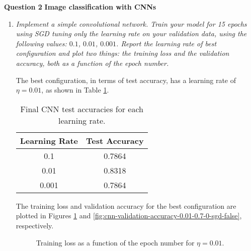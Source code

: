 \documentclass[12pt]{article}
\begin{document}
\center\large{\textbf{Question 2}}
\center\textbf{Image classification with CNNs}

\begin{enumerate}[leftmargin=\labelsep]

    \item \textit{Implement a simple convolutional network. Train your model for 15 epochs using SGD tuning only the learning rate on your validation data, using the following values: $0.1$, $0.01$, $0.001$. Report the learning rate of best configuration and plot two things: the training loss and the validation accuracy, both as a function of the epoch number.}

          \vspace{12pt}

          The best configuration, in terms of test accuracy, has a learning rate of $\eta = 0.01$, as shown in Table \ref{tab:cnn-pool-test-acc}.

          \begin{table}[H]
              \centering
              \begin{tabular}{|c|c|}
                  \hline
                  \textbf{Learning Rate} & \textbf{Test Accuracy} \\ \hline
                  0.1                    & 0.7864                 \\ \hline
                  0.01                   & 0.8318                 \\ \hline
                  0.001                  & 0.7864                 \\ \hline
              \end{tabular}
              \caption{Final CNN test accuracies for each learning rate.}
              \label{tab:cnn-pool-test-acc}
          \end{table}

          The training loss and validation accuracy for the best configuration are plotted in Figures \ref{fig:cnn-training-loss-0.01-0.7-0-sgd-false} and \ref{fig:cnn-validation-accuracy-0.01-0.7-0-sgd-false}, respectively.

          \begin{figure}[H]
              \centering
              
              \caption{Training loss as a function of the epoch number for $\eta = 0.01$.}
              \label{fig:cnn-training-loss-0.01-0.7-0-sgd-false}
          \end{figure}


\end{enumerate}
\end{document}
